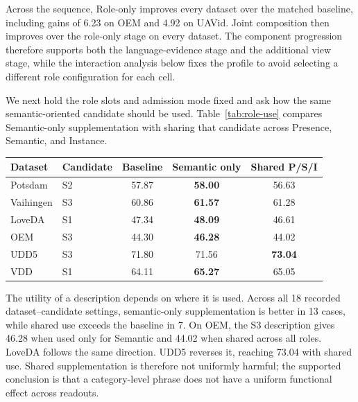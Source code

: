 Across the sequence, Role-only improves every dataset over the matched baseline, including gains of 6.23 on OEM and 4.92 on UAVid. Joint composition then improves over the role-only stage on every dataset. The component progression therefore supports both the language-evidence stage and the additional view stage, while the interaction analysis below fixes the profile to avoid selecting a different role configuration for each cell.

We next hold the role slots and admission mode fixed and ask how the same semantic-oriented candidate should be used. Table~\ref{tab:role-use} compares Semantic-only supplementation with sharing that candidate across Presence, Semantic, and Instance.

\begin{center}
\centering
\captionsetup{hypcap=false}
\label{tab:role-use}
\captionsetup{hypcap=true}
\small
\setlength{\tabcolsep}{2.5pt}
\begin{tabular}{llccc}
\toprule
Dataset & Candidate & Baseline & Semantic only & Shared P/S/I \\
\midrule
Potsdam & S2 & 57.87 & \textbf{58.00} & 56.63 \\
Vaihingen & S3 & 60.86 & \textbf{61.57} & 61.28 \\
LoveDA & S1 & 47.34 & \textbf{48.09} & 46.61 \\
OEM & S3 & 44.30 & \textbf{46.28} & 44.02 \\
UDD5 & S3 & 71.80 & 71.56 & \textbf{73.04} \\
VDD & S1 & 64.11 & \textbf{65.27} & 65.05 \\
\bottomrule
\end{tabular}
\end{center}

The utility of a description depends on where it is used. Across all 18 recorded dataset--candidate settings, semantic-only supplementation is better in 13 cases, while shared use exceeds the baseline in 7. On OEM, the S3 description gives 46.28 when used only for Semantic and 44.02 when shared across all roles. LoveDA follows the same direction. UDD5 reverses it, reaching 73.04 with shared use. Shared supplementation is therefore not uniformly harmful; the supported conclusion is that a category-level phrase does not have a uniform functional effect across readouts.

